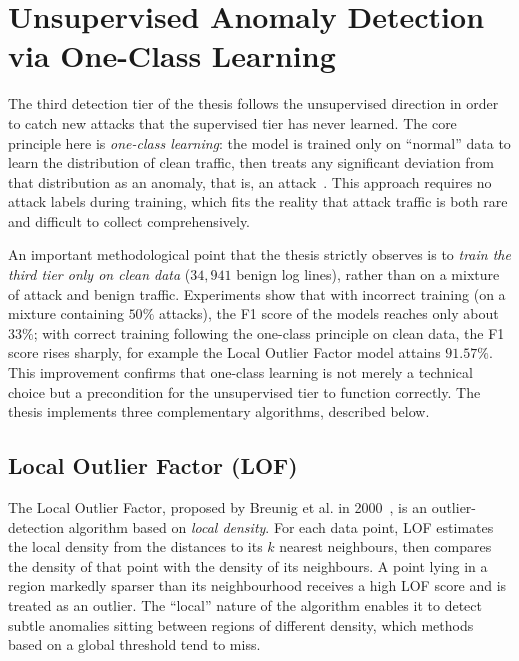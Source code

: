 \section{Unsupervised Anomaly Detection via One-Class Learning}
\label{sec:unsup}

The third detection tier of the thesis follows the unsupervised direction
in order to catch new attacks that the supervised tier has never learned.
The core principle here is \emph{one-class learning}: the model is trained
only on ``normal'' data to learn the distribution of clean traffic, then
treats any significant deviation from that distribution as an anomaly, that
is, an attack~\cite{scholkopf1999}. This approach requires no attack labels
during training, which fits the reality that attack traffic is both rare
and difficult to collect comprehensively.

An important methodological point that the thesis strictly observes is to
\emph{train the third tier only on clean data} ($34{,}941$ benign log
lines), rather than on a mixture of attack and benign traffic. Experiments
show that with incorrect training (on a mixture containing $50\%$ attacks),
the F1 score of the models reaches only about $33\%$; with correct training
following the one-class principle on clean data, the F1 score rises sharply,
for example the Local Outlier Factor model attains $91.57\%$. This
improvement confirms that one-class learning is not merely a technical
choice but a precondition for the unsupervised tier to function correctly.
The thesis implements three complementary algorithms, described below.

\subsection{Local Outlier Factor (LOF)}

The Local Outlier Factor, proposed by Breunig et al. in
2000~\cite{breunig2000}, is an outlier-detection algorithm based on
\emph{local density}. For each data point, LOF estimates the local density
from the distances to its $k$ nearest neighbours, then compares the density
of that point with the density of its neighbours. A point lying in a region
markedly sparser than its neighbourhood receives a high LOF score and is
treated as an outlier. The ``local'' nature of the algorithm enables it to
detect subtle anomalies sitting between regions of different density, which
methods based on a global threshold tend to miss.

